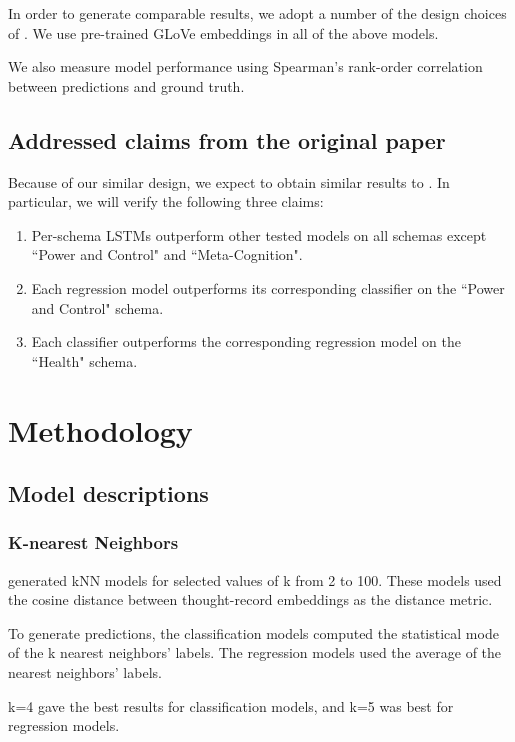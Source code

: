 \documentclass[11pt,a4paper]{article}
\begin{document}
In order to generate comparable results, we adopt a number of the design choices of \citeauthor{burger_2021}. We use pre-trained GLoVe embeddings \citep{pennington_2014} in all of the above models. 

We also measure model performance using Spearman's rank-order correlation between predictions and ground truth. 

\subsection{Addressed claims from the original paper}
\label{claims}
Because of our similar design, we expect to obtain similar results to \citeauthor{burger_2021}. In particular, we will verify the following three claims:
\begin{enumerate}
    \item Per-schema LSTMs outperform other tested models on all schemas except ``Power and Control" and ``Meta-Cognition".
    \item Each regression model outperforms its corresponding classifier on the ``Power and Control" schema.
    \item Each classifier outperforms the corresponding regression model on the ``Health" schema.
\end{enumerate}

\section{Methodology}
\subsection{Model descriptions}
\subsubsection{K-nearest Neighbors}
\citeauthor{burger_2021} generated kNN models for selected values of k from 2 to 100. These models used the cosine distance between thought-record embeddings as the distance metric.

To generate predictions, the classification models computed the statistical mode of the k nearest neighbors' labels. The regression models used the average of the nearest neighbors' labels.

k=4 gave the best results for classification models, and k=5 was best for regression models.
\end{document}
